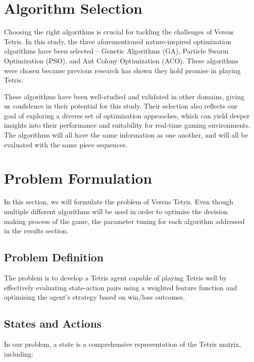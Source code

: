 \documentclass[a4paper, 12pt]{extreport}
\begin{document}
		\section{Algorithm Selection}\label{sec:algo-select}
			Choosing the right algorithms is crucial for tackling the challenges of Versus Tetris. In this study, the three aforementioned nature-inspired optimization algorithms have been selected -- Genetic Algorithms (GA), Particle Swarm Optimization (PSO), and Ant Colony Optimization (ACO). These algorithms were chosen because previous research has shown they hold promise in playing Tetris.
			
			These algorithms have been well-studied and validated in other domains, giving us confidence in their potential for this study. Their selection also reflects our goal of exploring a diverse set of optimization approaches, which can yield deeper insights into their performance and suitability for real-time gaming environments. The algorithms will all have the same information as one another, and will all be evaluated with the same piece sequences.
		
		\section{Problem Formulation}\label{sec:problem-formulation}
		
			In this section, we will formulate the problem of Versus Tetris. Even though multiple different algorithms will be used in order to optimise the decision making process of the game, the parameter tuning for each algorithm addressed in the results section.
		
			\subsection{Problem Definition}
			
				The problem is to develop a Tetris agent capable of playing Tetris well by effectively evaluating state-action pairs using a weighted feature function and optimising the agent's strategy based on win/loss outcomes.

			\subsection{States and Actions}
			
				In our problem, a state is a comprehensive representation of the Tetris matrix, including:
				
\end{document}

